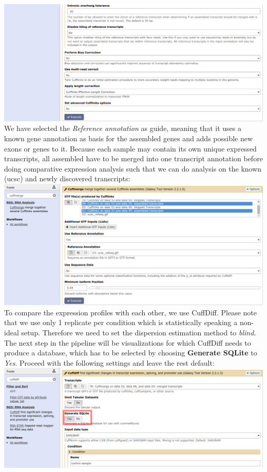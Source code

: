 \documentclass[11pt,a4paper]{article}
\begin{document}
\includegraphics[width=\textwidth]{figures/basic_02b.png}\\
We have selected the \textit{Reference annotation} as guide, meaning that it uses a known gene annotation as basis for the assembled genes and adds possible new exons or genes to it. Because each sample may contain its own unique expressed transcripts, all assembled have to be merged into one transcript annotation before doing comparative expression analysis such that we can do analysis on the known (ucsc) and newly discovered transcripts:\\
\includegraphics[width=\textwidth]{figures/basic_03.png}\\
To compare the expression profiles with each other, we use CuffDiff. Please note that we use only 1 replicate per condition which is statistically speaking a non-ideal setup. Therefore we need to set the dispersion estimation method to \textit{blind}. The next step in the pipeline will be visualizations for which CuffDiff needs to produce a database, which has to be selected by choosing \textbf{Generate SQLite} to \textit{Yes}. Proceed with the following settings and leave the rest default:\\
\includegraphics[width=\textwidth]{figures/basic_04a.png}\\
\end{document}
